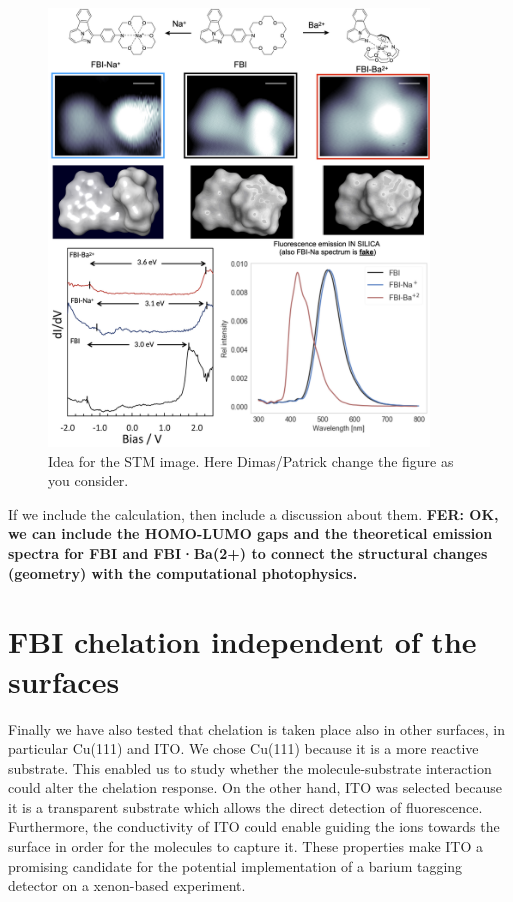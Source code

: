 \documentclass[aps,prl,reprint,longbibliography,superscriptaddress, english]{revtex4-1}
\newcommand{\completar}[1]{{\color{red} #1}}
\begin{document}
\begin{figure}[ht!]
	\includegraphics[width=0.9\textwidth]{figures/fig4_stm_chelation.png}
	\caption{\label{STM_chelation} 
    Idea for the STM image. Here Dimas/Patrick change the figure as you consider. }
\end{figure}  

\completar{If we include the calculation, then include a discussion about them.\textbf{ FER: OK, we can include the HOMO-LUMO gaps and the theoretical emission spectra for FBI and FBI·Ba(2+) to connect the structural changes (geometry) with the computational photophysics.}}


\section{FBI chelation independent of the surfaces}

Finally we have also tested that chelation is taken place also in other surfaces, in particular Cu(111) and ITO. We chose Cu(111) because it is a more reactive substrate. This enabled us to study whether the molecule-substrate interaction could alter the chelation response. On the other hand, ITO was selected because it is a transparent substrate which allows the direct detection of fluorescence. \completar{Furthermore, the conductivity of ITO could enable guiding the \Bapp ions towards the surface in order for the molecules to capture it. These properties make ITO a promising candidate for the potential implementation of a barium tagging detector on a xenon-based experiment\cite{rivilla_fluorescent_2020}}.
\end{document}
